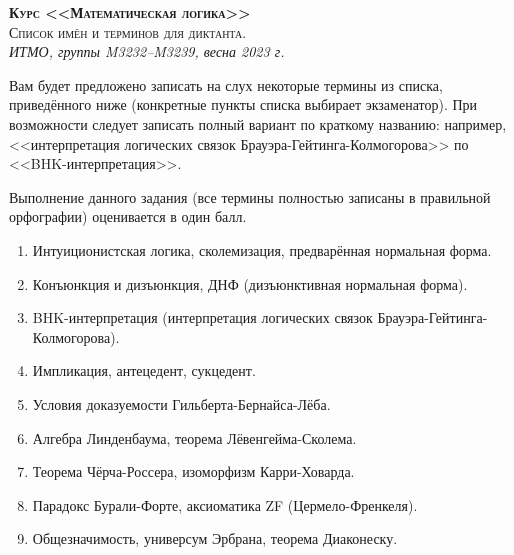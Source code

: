 \documentclass[11pt,a4paper,oneside]{scrartcl}
\begin{document}
\pagestyle{empty}

\begin{center}
{\large\scshape\bfseries Курс <<Математическая логика>>}\\
{\large\scshape Список имён и терминов для диктанта.}\\
\itshape ИТМО, группы M3232--M3239, весна 2023 г.
\end{center}


Вам будет предложено записать на слух некоторые термины из списка, приведённого ниже 
(конкретные пункты списка выбирает экзаменатор). При возможности следует записать полный вариант 
по краткому названию: например, <<интерпретация логических связок Брауэра-Гейтинга-Колмогорова>> 
по <<BHK-интерпретация>>.

Выполнение данного задания (все термины полностью записаны в правильной орфографии) 
оценивается в один балл.

\begin{enumerate}
\item Интуиционистская логика, сколемизация, предварённая нормальная форма.
\item Конъюнкция и дизъюнкция, ДНФ (дизъюнктивная нормальная форма).
\item BHK-интерпретация (интерпретация логических связок Брауэра-Гейтинга-Колмогорова).
\item Импликация, антецедент, сукцедент.
\item Условия доказуемости Гильберта-Бернайса-Лёба.
\item Алгебра Линденбаума, теорема Лёвенгейма-Сколема.
\item Теорема Чёрча-Россера, изоморфизм Карри-Ховарда.
\item Парадокс Бурали-Форте, аксиоматика ZF (Цермело-Френкеля).
\item Общезначимость, универсум Эрбрана, теорема Диаконеску.
\end{enumerate}
\end{document}
